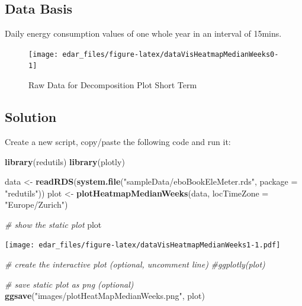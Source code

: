 \documentclass[
  a4paperpaper,
]{book}
\newenvironment{Shaded}{\begin{snugshade}}{\end{snugshade}}
\newcommand{\CommentTok}[1]{\textcolor[rgb]{0.56,0.35,0.01}{\textit{#1}}}
\newcommand{\DataTypeTok}[1]{\textcolor[rgb]{0.13,0.29,0.53}{#1}}
\newcommand{\KeywordTok}[1]{\textcolor[rgb]{0.13,0.29,0.53}{\textbf{#1}}}
\newcommand{\NormalTok}[1]{#1}
\newcommand{\StringTok}[1]{\textcolor[rgb]{0.31,0.60,0.02}{#1}}
\let\oldShaded\Shaded
\let\endoldShaded\endShaded
\renewenvironment{Shaded}{\footnotesize\oldShaded}{\endoldShaded}
\begin{document}
\hypertarget{data-basis-11}{%
\subsection{Data Basis}\label{data-basis-11}}

Daily energy consumption values of one whole year in an interval of 15mins.

\begin{figure}
\texttt{[image: edar\_files/figure-latex/dataVisHeatmapMedianWeeks0-1]} \caption{Raw Data for Decomposition Plot Short Term}\label{fig:dataVisHeatmapMedianWeeks0}
\end{figure}

\newpage

\hypertarget{solution-11}{%
\subsection{Solution}\label{solution-11}}

Create a new script, copy/paste the following code and run it:

\begin{Shaded}
\begin{Highlighting}[]
\KeywordTok{library}\NormalTok{(redutils)}
\KeywordTok{library}\NormalTok{(plotly)}

\NormalTok{data <-}\StringTok{ }\KeywordTok{readRDS}\NormalTok{(}\KeywordTok{system.file}\NormalTok{(}\StringTok{"sampleData/eboBookEleMeter.rds"}\NormalTok{, }\DataTypeTok{package =} \StringTok{"redutils"}\NormalTok{))}
\NormalTok{plot <-}\StringTok{ }\KeywordTok{plotHeatmapMedianWeeks}\NormalTok{(data, }\DataTypeTok{locTimeZone =} \StringTok{"Europe/Zurich"}\NormalTok{)}

\CommentTok{# show the static plot}
\NormalTok{plot}
\end{Highlighting}
\end{Shaded}

\texttt{[image: edar\_files/figure-latex/dataVisHeatmapMedianWeeks1-1.pdf]}

\begin{Shaded}
\begin{Highlighting}[]
\CommentTok{# create the interactive plot (optional, uncomment line)}
\CommentTok{#ggplotly(plot)}
\end{Highlighting}
\end{Shaded}

\begin{Shaded}
\begin{Highlighting}[]
\CommentTok{# save static plot as png (optional)}
\KeywordTok{ggsave}\NormalTok{(}\StringTok{"images/plotHeatMapMedianWeeks.png"}\NormalTok{, plot)}
\end{Highlighting}
\end{Shaded}
\end{document}
